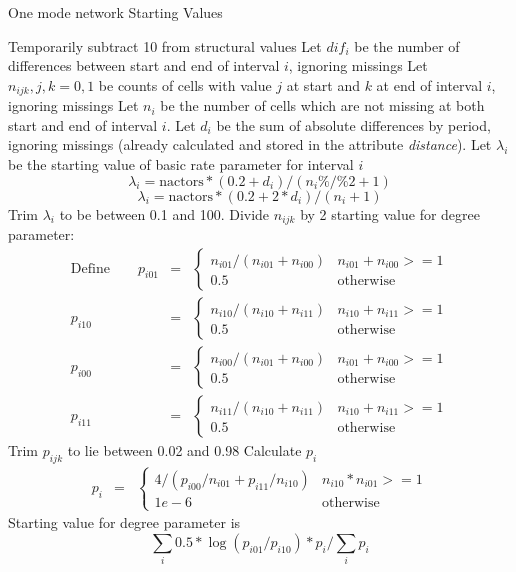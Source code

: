 \documentclass[12pt,a4paper]{article}
\makeatletter
\renewcommand{\=}{\,=\,}
\newcommand{\+}{\,+\,}
\newcommand{\nnm}[1]{\textsf{\small\textit{#1}}}
\renewcommand{\subsection}{\@startsection{subsection}{2}
                {0pt}{0.7\baselineskip}{0.3\baselineskip}
                {\sffamily} }
\makeatother
\begin{document}
\subsection{One mode network Starting Values}
\label{sec:onemodestart}
\begin{algorithmic}
\STATE Temporarily subtract 10 from structural values
\STATE Let $dif_i$ be the number of differences between start and end of
interval $i$, ignoring missings
\STATE Let $n_{ijk}, j, k = 0,1$ be counts of cells with value $j$ at start
and $k$ at end of interval $i$, ignoring missings
\STATE Let $n_i$ be the number of cells which are not missing at both start
and end of interval $i$.
\STATE Let $d_i$ be the sum of absolute differences by period, ignoring missings
(already calculated and stored in the attribute \nnm{distance}).
\STATE Let $\lambda_i$ be the starting value of basic rate parameter for
interval $i$
\STATE
$$\lambda_i = \mathrm{nactors} * (0.2 + d_i)/(n_i \%/\% 2 + 1)$$
\ELSE
\STATE
$$\lambda_i = \mathrm{nactors} * (0.2 + 2 * d_i)/(n_i + 1)$$
\ENDIF
\STATE Trim $\lambda_i$ to be between 0.1 and 100.
\STATE Divide $n_{ijk}$ by 2
\ENDIF
\STATE starting value for degree parameter:
\begin{align*}
\mathrm{Define } \qquad  p_{i01} &=& \begin{cases}
n_{i01}/ (n_{i01} + n_{i00}) &n_{i01} + n_{i00} >= 1  \\
0.5& \mathrm{otherwise}
\end{cases}\\
p_{i10} &=& \begin{cases}
n_{i10}/ (n_{i10} + n_{i11}) &n_{i10} + n_{i11} >= 1  \\
0.5& \mathrm{otherwise}
\end{cases}\\
  p_{i00} &=& \begin{cases}
n_{i00}/ (n_{i01} + n_{i00}) &n_{i01} + n_{i00} >= 1  \\
0.5& \mathrm{otherwise}
\end{cases}\\
p_{i11} &=& \begin{cases}
n_{i11}/ (n_{i10} + n_{i11}) &n_{i10} + n_{i11} >= 1  \\
0.5& \mathrm{otherwise}
\end{cases}
\end{align*}
\STATE Trim $p_{ijk}$ to lie between 0.02 and 0.98
\STATE Calculate $p_i$
\begin{align*}
p_i &=& \begin{cases}
4 / (p_{i00} / n_{i01} + p_{i11} / n_{i10})& n_{i10} * n_{i01} >= 1  \\
1e-6& \mathrm{otherwise}
\end{cases}
\end{align*}
\STATE Starting value for degree parameter is\\
$$ \sum_i 0.5 * \log(p_{i01} / p_{i10}) * p_i / \sum_i p_i $$
\end{algorithmic}
\end{document}
